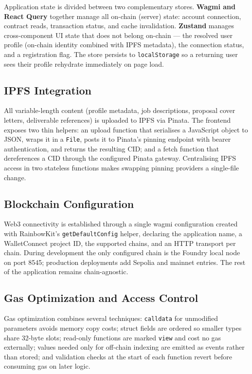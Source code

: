 Application state is divided between two complementary stores. \textbf{Wagmi and React Query} together manage all on-chain (server) state: account connection, contract reads, transaction status, and cache invalidation. \textbf{Zustand} manages cross-component UI state that does not belong on-chain --- the resolved user profile (on-chain identity combined with IPFS metadata), the connection status, and a registration flag. The store persists to \texttt{localStorage} so a returning user sees their profile rehydrate immediately on page load.

\subsection{IPFS Integration}

All variable-length content (profile metadata, job descriptions, proposal cover letters, deliverable references) is uploaded to IPFS via Pinata. The frontend exposes two thin helpers: an upload function that serialises a JavaScript object to JSON, wraps it in a \texttt{File}, posts it to Pinata's pinning endpoint with bearer authentication, and returns the resulting CID; and a fetch function that dereferences a CID through the configured Pinata gateway. Centralising IPFS access in two stateless functions makes swapping pinning providers a single-file change.

\subsection{Blockchain Configuration}

Web3 connectivity is established through a single wagmi configuration created with RainbowKit's \texttt{getDefaultConfig} helper, declaring the application name, a WalletConnect project ID, the supported chains, and an HTTP transport per chain. During development the only configured chain is the Foundry local node on port 8545; production deployments add Sepolia and mainnet entries. The rest of the application remains chain-agnostic.

\subsection{Gas Optimization and Access Control}

Gas optimization combines several techniques: \texttt{calldata} for unmodified parameters avoids memory copy costs; struct fields are ordered so smaller types share 32-byte slots; read-only functions are marked \texttt{view} and cost no gas externally; values needed only for off-chain indexing are emitted as events rather than stored; and validation checks at the start of each function revert before consuming gas on later logic.

